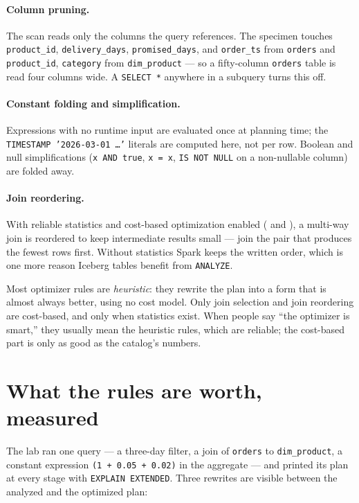 \paragraph{Column pruning.} The scan reads only the columns the query
references. The specimen touches \texttt{product\_id}, \texttt{delivery\_days},
\texttt{promised\_days}, and \texttt{order\_ts} from \texttt{orders} and
\texttt{product\_id}, \texttt{category} from \texttt{dim\_product} --- so a
fifty-column \texttt{orders} table is read four columns wide. A
\texttt{SELECT *} anywhere in a subquery turns this off.

\paragraph{Constant folding and simplification.} Expressions with no runtime
input are evaluated once at planning time; the \texttt{TIMESTAMP '2026-03-01
\dots'} literals are computed here, not per row. Boolean and null simplifications
(\texttt{x AND true}, \texttt{x = x}, \texttt{IS NOT NULL} on a non-nullable
column) are folded away.

\paragraph{Join reordering.} With reliable statistics and cost-based
optimization enabled ( and
), a multi-way join is reordered to keep
intermediate results small --- join the pair that produces the fewest rows
first. Without statistics Spark keeps the written order, which is one more reason
Iceberg tables benefit from \texttt{ANALYZE}.

\begin{note}
Most optimizer rules are \emph{heuristic}: they rewrite the plan into a form
that is almost always better, using no cost model. Only join selection and join
reordering are cost-based, and only when statistics exist. When people say
``the optimizer is smart,'' they usually mean the heuristic rules, which are
reliable; the cost-based part is only as good as the catalog's numbers.
\end{note}

\section{What the rules are worth, measured}
\label{sec:catalyst-rules-measured}

The lab ran one query --- a three-day filter, a join of \texttt{orders} to
\texttt{dim\_product}, a constant expression \texttt{(1 + 0.05 + 0.02)} in the
aggregate --- and printed its plan at every stage with \texttt{EXPLAIN EXTENDED}.
Three rewrites are visible between the analyzed and the optimized plan:

